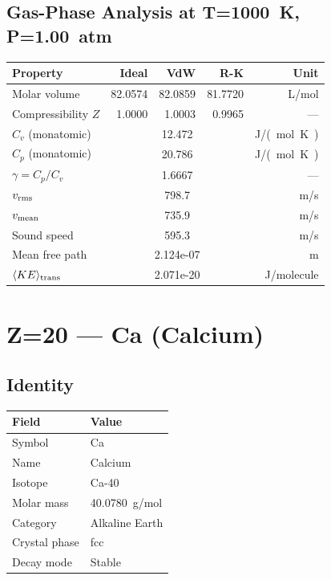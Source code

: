 \documentclass[11pt,a4paper]{article}
\begin{document}
\subsection{Gas-Phase Analysis at T=\SI{1000}{K}, P=\SI{1.00}{atm}}
\begin{tabular}{lrrrr}
  \toprule
  Property & Ideal & VdW & R-K & Unit \\
  \midrule
  Molar volume & 82.0574 & 82.0859 & 81.7720 & \si{L/mol} \\
  Compressibility $Z$ & 1.0000 & 1.0003 & 0.9965 & --- \\
  \midrule
  $C_v$ (monatomic) & \multicolumn{3}{c}{12.472} & \si{J/(mol.K)} \\
  $C_p$ (monatomic) & \multicolumn{3}{c}{20.786} & \si{J/(mol.K)} \\
  $\gamma = C_p/C_v$ & \multicolumn{3}{c}{1.6667} & --- \\
  $v_{\rm rms}$ & \multicolumn{3}{c}{798.7} & \si{m/s} \\
  $v_{\rm mean}$ & \multicolumn{3}{c}{735.9} & \si{m/s} \\
  Sound speed & \multicolumn{3}{c}{595.3} & \si{m/s} \\
  Mean free path & \multicolumn{3}{c}{2.124e-07} & \si{m} \\
  $\langle KE \rangle_{\rm trans}$ & \multicolumn{3}{c}{2.071e-20} & \si{J/molecule} \\
  \bottomrule
\end{tabular}

\newpage

\section{Z=20 --- Ca (Calcium)}
\label{sec:Z20}

\subsection{Identity}
\begin{tabular}{ll}
  \toprule
  Field & Value \\
  \midrule
  Symbol & Ca \\
  Name & Calcium \\
  Isotope & Ca-40 \\
  Molar mass & \SI{40.0780}{g/mol} \\
  Category & Alkaline Earth \\
  Crystal phase & fcc \\
  Decay mode & Stable \\
  \bottomrule
\end{tabular}
\end{document}
